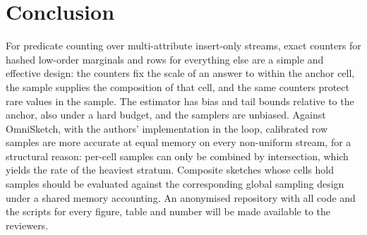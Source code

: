 \documentclass[sigconf]{acmart}
\newcommand{\omni}{OmniSketch\xspace}
\begin{document}
\section{Conclusion}

For predicate counting over multi-attribute insert-only streams, exact counters for hashed low-order
marginals and rows for everything else are a simple and effective design: the counters fix the scale of an
answer to within the anchor cell, the sample supplies the composition of that cell, and the same counters
protect rare values in the sample. The estimator has bias and tail bounds relative to the anchor, also
under a hard budget, and the samplers are unbiased. Against \omni, with the authors' implementation in
the loop, calibrated row samples are more accurate at equal memory on every non-uniform stream, for a
structural reason: per-cell samples can only be combined by intersection, which yields the rate of the
heaviest stratum. Composite sketches whose cells hold samples should be evaluated against the
corresponding global sampling design under a shared memory accounting. An anonymised repository with all
code and the scripts for every figure, table and number will be made available to the reviewers.

\ifdefined\cameraready\fi



\end{document}
